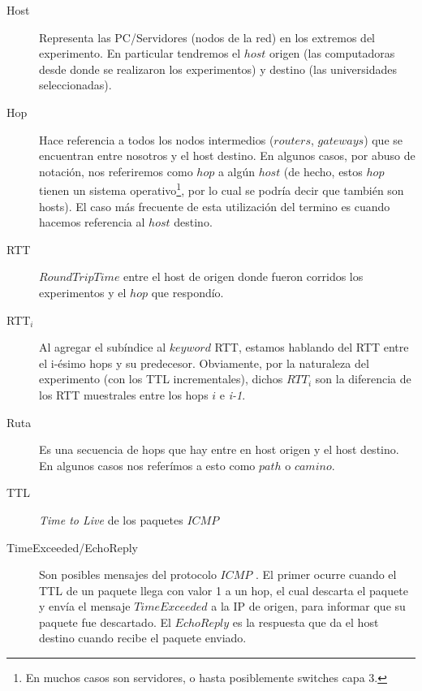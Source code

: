 \begin{description}
	\item[Host] Representa las PC/Servidores (nodos de la red) en los
		extremos del experimento. En particular tendremos el 
		$host$ origen (las computadoras desde donde se realizaron
		los experimentos) y destino (las universidades seleccionadas).
	\bigskip

	\item[Hop] Hace referencia a todos los nodos intermedios ($routers$,
		$gateways$) que se encuentran entre nosotros y el host
		destino. En algunos casos, por abuso de notaci\'on, nos
		referiremos como $hop$ a alg\'un $host$ (de hecho, estos
		$hop$ tienen un sistema operativo\footnote{En muchos casos
		son servidores, o hasta posiblemente switches capa 3.}, por
		lo cual se podr\'ia decir que tambi\'en son hosts). El
		caso m\'as frecuente de esta utilizaci\'on del termino es
		cuando hacemos referencia al $host$ destino.
	\bigskip

	\item[RTT] $Round Trip Time$ entre el host de origen donde fueron
		corridos los experimentos y el $hop$ que respond\'io.
	\bigskip

	\item[RTT$_i$] Al agregar el sub\'indice al $keyword$ RTT,
		estamos hablando del RTT entre el i-\'esimo hops
		y su predecesor. Obviamente, por la naturaleza del experimento
		(con los TTL incrementales), dichos $RTT_i$ son la diferencia
		de los RTT muestrales entre los hops $i$ e \textit{i-1}.
	\bigskip

	\item[Ruta] Es una secuencia de hops que hay entre en host origen
		y el host destino. En algunos casos nos refer\'imos a esto
		como $path$ o $camino$.
	\bigskip
	
	\item[TTL] \textit{Time to Live}\cite{rfc792} de los paquetes $ICMP$
	\bigskip

	\item[TimeExceeded/EchoReply] Son posibles mensajes del protocolo $ICMP$%
	\cite{rfc792}. El primer ocurre cuando el TTL de un paquete llega
	con valor 1 a un hop, el cual descarta el paquete y env\'ia el mensaje
	$TimeExceeded$ a la IP de origen, para informar que su paquete fue
	descartado. El $EchoReply$ es la respuesta que da el host destino
	cuando recibe el paquete enviado.
\end{description}


